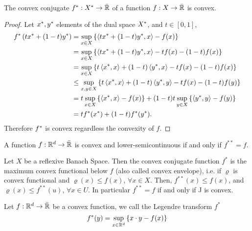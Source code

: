 \begin{proposition}
	The convex conjugate ${f}^*:{X}^*\rightarrow \bar{\mathbb{R}}$ of a function $f:X\rightarrow\bar{\mathbb{R}}$ is convex.
	\begin{proof}
		Let ${x}^*, {y}^*$ elements of the dual space ${X}^*$, and $t\in[0,1]$,
		\begin{align*}
			{f}^*\left( t{x}^*+(1-t){y}^* \right)&=\sup_{x\in X}\left\lbrace \left\langle t{x}^*+(1-t){y}^*, x \right\rangle-f(x) \right\rbrace \\
			&=\sup_{x\in X}\left\lbrace \left\langle t{x}^*+(1-t){y}^*, x \right\rangle-tf(x)-(1-t)f(x) \right\rbrace\\
			&=\sup_{x\in X}\left\lbrace t\left\langle {x}^*, x \right\rangle+(1-t)\left\langle {y}^*, x \right\rangle-tf(x)-(1-t)f(x) \right\rbrace\\
			&\leq \sup_{x, y \in X} \left\lbrace t\left\langle {x}^*, x \right\rangle+(1-t)\left\langle {y}^*, y \right\rangle-tf(x)-(1-t)f(y) \right\rbrace\\
			&=t\sup_{x \in X} \left\lbrace \left\langle {x}^*, x \right\rangle-f(x) \right\rbrace+(1-t)t\sup_{y \in X} \left\lbrace \left\langle {y}^*, y \right\rangle-f(y) \right\rbrace\\
			&=t{f}^*({x}^*)+(1-t){f}^*({y}^*).
		\end{align*}
		Therefore ${f}^*$ is convex regardless the convexity of $f$.
	\end{proof}
\end{proposition}

\begin{theorem} 
	A function $f:\mathbb{R}^d \rightarrow \bar{\mathbb{R}}$ is convex and lower-semicontinuous if and only if $f^{**}=f$.
\end{theorem}
	
\begin{lemma}
	Let $X$ be a reflexive Banach Space. Then the convex conjugate function $f^*$ is the maximum convex functional below $f$ (also called convex envelope), i.e. if $\varrho$ is convex functional and $\varrho(x)\leq f(x)$, $\forall x \in X$. Then, $f^{**}(x)\leq f(x)$, and $\varrho(x)\leq f^{**}(u)$, $\forall x \in U $. In particular $f^{**} = f$ if and only if J is convex.
\end{lemma}

\begin{definition}
	Let $f: \mathbb{R}^d\rightarrow \bar{\mathbb{R}}$ be a convex function, we call the Legendre transform $f^*$
	\begin{equation*}
	f^*(y)=\sup_{x\in \mathbb{R}^d} \left\lbrace x\cdot y -f(x) \right\rbrace
	\end{equation*}
\end{definition}

